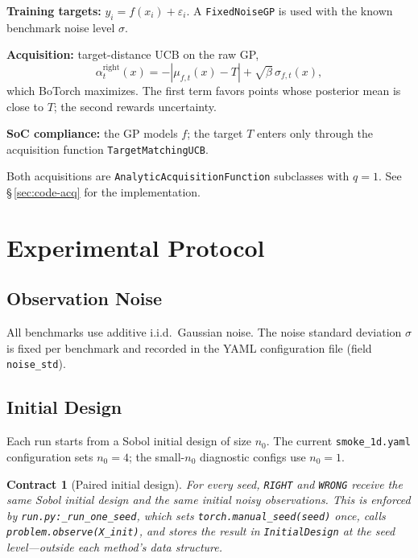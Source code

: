 \documentclass[11pt]{article}
\newtheorem{contract}{Contract}
\newcommand{\RIGHT}{\texttt{RIGHT}}
\newcommand{\WRONG}{\texttt{WRONG}}
\begin{document}
\textbf{Training targets:} $y_i = f(x_i) + \varepsilon_i$.
A \texttt{FixedNoiseGP} is used with the known benchmark noise level $\sigma$.
 
\textbf{Acquisition:} target-distance UCB on the raw GP,
\[
  \alpha_t^{\mathrm{right}}(x)
  = -|\mu_{f,t}(x) - T| + \sqrt{\beta}\,\sigma_{f,t}(x),
\]
which BoTorch maximizes.
The first term favors points whose posterior mean is close to $T$;
the second rewards uncertainty.
 
\textbf{SoC compliance:} the GP models $f$; the target $T$ enters only through the
acquisition function \texttt{TargetMatchingUCB}.
 
Both acquisitions are \texttt{AnalyticAcquisitionFunction} subclasses with $q=1$.
See \S\,\ref{sec:code-acq} for the implementation.
 
\section{Experimental Protocol}
\label{sec:protocol}
 
\subsection{Observation Noise}
 
All benchmarks use additive i.i.d.\ Gaussian noise.
The noise standard deviation $\sigma$ is fixed per benchmark and recorded in the YAML
configuration file (field \texttt{noise\_std}).
 
\subsection{Initial Design}
 
Each run starts from a Sobol initial design of size $n_0$.
The current \texttt{smoke\_1d.yaml} configuration sets $n_0 = 4$; the small-$n_0$
diagnostic configs use $n_0 = 1$.
 
\begin{contract}[Paired initial design]
\label{contract:paired}
For every seed, \RIGHT{} and \WRONG{} receive the \emph{same} Sobol initial design and
the \emph{same} initial noisy observations.
This is enforced by \texttt{run.py:\_run\_one\_seed}, which sets
\texttt{torch.manual\_seed(seed)} once, calls \texttt{problem.observe(X\_init)}, and
stores the result in \texttt{InitialDesign} at the seed level---\emph{outside} each
method's data structure.
\end{contract}
 
\end{document}
